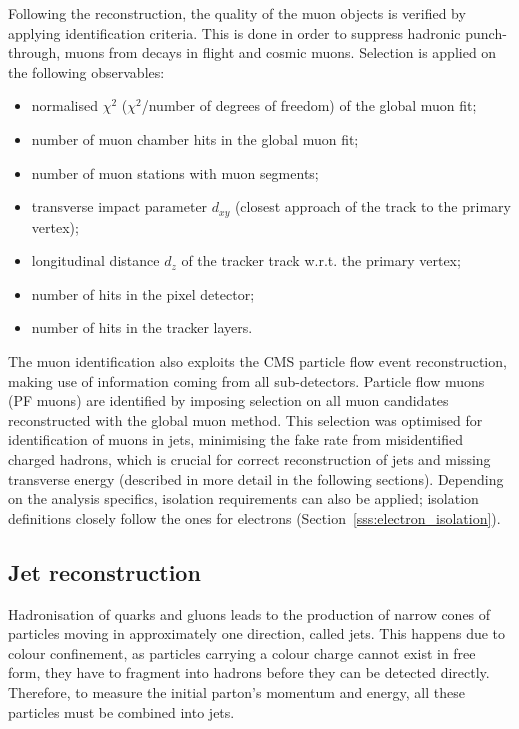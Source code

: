 Following the reconstruction, the quality of the muon objects is verified by applying identification criteria. This is
done in order to suppress hadronic punch-through, muons from decays in flight and cosmic muons. Selection is applied on
the following observables:
\begin{itemize}
  \item normalised $\chi^2$ ($\chi^2$/number of degrees of freedom) of the global muon fit;
  \item number of muon chamber hits in the global muon fit;
  \item number of muon stations with muon segments;
  \item transverse impact parameter $d_{xy}$ (closest approach of the track to the primary vertex);
  \item longitudinal distance $d_z$ of the tracker track w.r.t. the primary vertex;
  \item number of hits in the pixel detector;
  \item number of hits in the tracker layers.
\end{itemize}

The muon identification also exploits the CMS particle flow event reconstruction, making use of information coming from
all sub-detectors. Particle flow muons (PF muons) are identified by imposing selection on all muon candidates
reconstructed with the global muon method. This selection was optimised for identification of muons in jets, minimising
the fake rate from misidentified charged hadrons, which is crucial for correct reconstruction of jets and missing
transverse energy (described in more detail in the following sections). Depending on the analysis specifics, isolation
requirements can also be applied; isolation definitions closely follow the ones for electrons
(Section~\ref{sss:electron_isolation}).

\subsection{Jet reconstruction}
\label{ss:jet_reconstruction}
Hadronisation of quarks and gluons leads to the production of narrow cones of particles moving in approximately one
direction, called jets. This happens due to colour confinement, as particles carrying a colour charge cannot exist in
free form, they have to fragment into hadrons before they can be detected directly. Therefore, to measure the initial
parton's momentum and energy, all these particles must be combined into jets.

